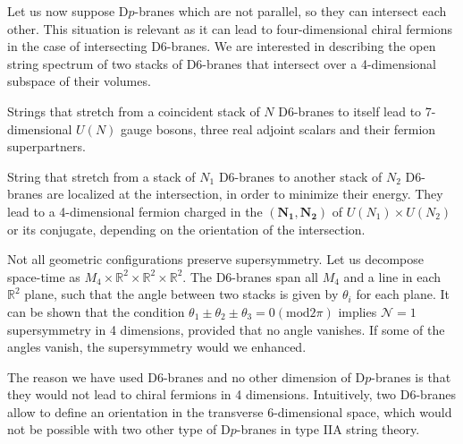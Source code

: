 Let us now suppose D$p$-branes which are not parallel, so they can intersect each other.
This situation is relevant as it can lead to four-dimensional chiral fermions in the case of intersecting D6-branes.
We are interested in describing the open string spectrum of two stacks of D$6$-branes that intersect over a 4-dimensional subspace of their volumes.

Strings that stretch from a coincident stack of $N$ D6-branes to itself lead to 7-dimensional $U(N)$ gauge bosons, three real adjoint scalars and their fermion superpartners.

String that stretch from a stack of $N_1$ D6-branes to another stack of $N_2$ D6-branes are localized at the intersection,
in order to minimize their energy. 
They lead to a 4-dimensional fermion charged in the $(\mathbf{N_1},\mathbf{N_2})$ of $U(N_1)\times U(N_2)$ or its conjugate, depending on the orientation
of the intersection.

Not all geometric configurations preserve supersymmetry. 
Let us decompose space-time as $M_4 \times \mathbb R^2 \times \mathbb R^2 \times \mathbb R^2 $.
The D6-branes span all $M_4$ and a line in each $\mathbb R^2$ plane, such that the angle between
two stacks is given by $\theta_i$ for each plane.
It can be shown that the condition $\theta_1\pm\theta_2\pm\theta_3=0 (\mathrm{mod} 2\pi)$ implies $\mathcal N=1$ 
supersymmetry in 4 dimensions, provided that no angle vanishes.
If some of the angles vanish, the supersymmetry would we enhanced.

The reason we have used D6-branes and no other dimension of D$p$-branes is that they would not lead to chiral fermions in 4 dimensions.
Intuitively, two D6-branes allow to define an orientation in the transverse 6-dimensional space, which would not be possible
with two other type of D$p$-branes in type IIA string theory.

